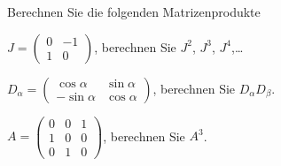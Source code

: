 Berechnen Sie die folgenden Matrizenprodukte
\begin{teilaufgaben}
\item $J=
\begin{pmatrix}0&-1\\1&0\end{pmatrix}
$, berechnen Sie $J^2$, $J^3$,
$J^4$,\dots
\item $D_\alpha=\begin{pmatrix}\cos\alpha&\sin\alpha\\-\sin\alpha&\cos\alpha\end{pmatrix}$, berechnen Sie $D_\alpha D_\beta$.
\item $A=
\begin{pmatrix}0&0&1\\1&0&0\\0&1&0\end{pmatrix}
$, berechnen Sie
$A^3$.
\end{teilaufgaben}


